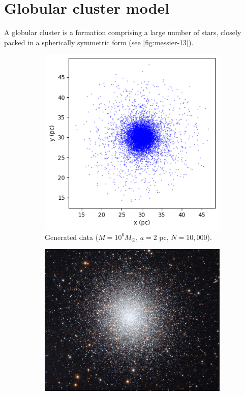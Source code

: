 \section{Globular cluster model}\label{sec:globular-cluster-model}
A globular cluster is a formation comprising a large number of stars, closely packed in a spherically symmetric form \cite{britannica2024globular} (see \autoref{fig:messier-13}).
\begin{figure}[!ht]
    \centering
    \begin{subfigure}[b]{0.4\textwidth}
        \centering
        \includegraphics[width=\textwidth]{chapters/test-models/img/globular_generated.png}
        \caption{Generated data ($M=10^{6} M_\odot$, $a=2$ pc, $N=10,000$).}
        \label{fig:glob-cluster-model-generated}
    \end{subfigure}
    \hfill
    \begin{subfigure}[b]{0.4\textwidth}
        \centering
        \includegraphics[width=\textwidth]{chapters/test-models/img/glob_cluster_m13.jpg}

\end{subfigure}
\end{figure}
